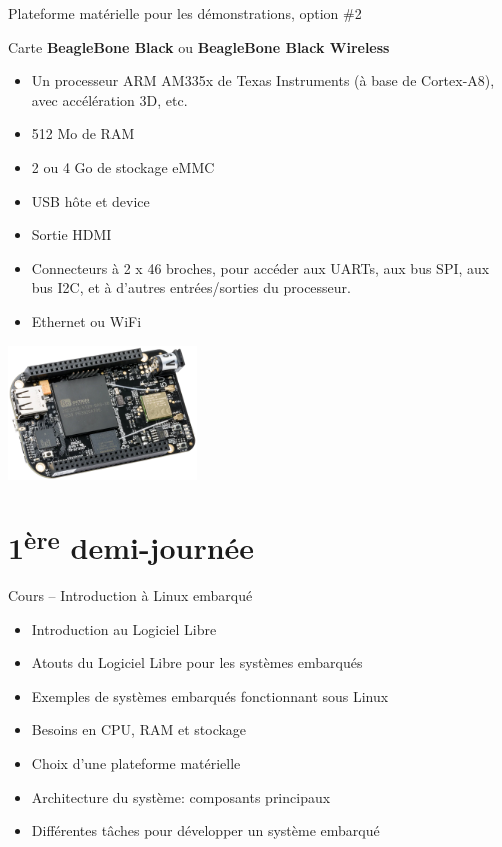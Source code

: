 \documentclass[a4paper,12pt,obeyspaces,spaces,hyphens]{article}
\begin{document}
\feagendatwocolumn
{Plateforme matérielle pour les démonstrations, option \#2}
{
  Carte {\bf BeagleBone Black} ou {\bf BeagleBone Black Wireless}
  \begin{itemize}
  \item Un processeur ARM AM335x de Texas Instruments (à base de
    Cortex-A8), avec accélération 3D, etc.
  \item 512 Mo de RAM
  \item 2 ou 4 Go de stockage eMMC
  \item USB hôte et device
  \item Sortie HDMI
  \item Connecteurs à 2 x 46 broches, pour accéder aux UARTs, aux bus
    SPI, aux bus I2C, et à d'autres entrées/sorties du processeur.
  \item Ethernet ou WiFi
  \end{itemize}
}
{}
{
  \begin{center}
    \includegraphics[width=5cm]{../slides/beagleboneblack-board/beagleboneblack.png}
  \end{center}
}

\section{1\textsuperscript{ère} demi-journée}

\feagendaonecolumn
{Cours – Introduction à Linux embarqué}
{
  \begin{itemize}
  \item Introduction au Logiciel Libre
  \item Atouts du Logiciel Libre pour les systèmes embarqués
  \item Exemples de systèmes embarqués fonctionnant sous Linux
  \item Besoins en CPU, RAM et stockage
  \item Choix d'une plateforme matérielle
  \item Architecture du système: composants principaux
  \item Différentes tâches pour développer un système embarqué
  \end{itemize}
}
\end{document}
